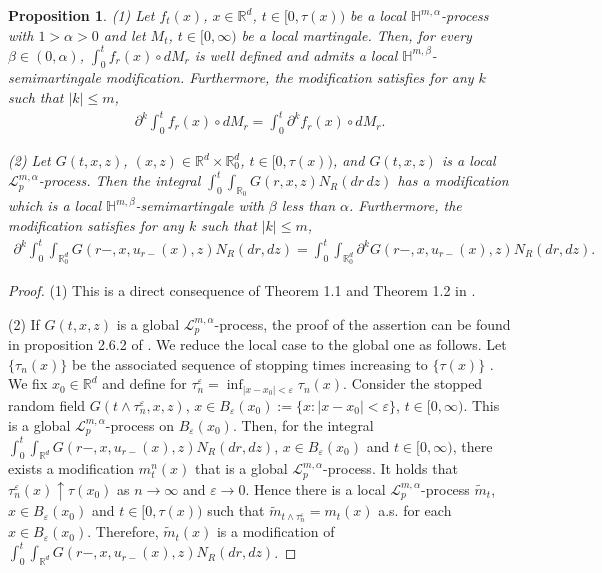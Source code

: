 \documentclass[10pt,a4paper]{amsart}
\newcommand{\ce}{\begin{eqnarray*}}
\newcommand{\de}{\end{eqnarray*}}
\newtheorem{proposition}[theorem]{Proposition}
\def\mH{{\mathbb H}}
\def\mR{{\mathbb R}}
\def\sL{{\mathscr L}}
\def\leq{\leqslant}
\numberwithin{equation}{section}
\begin{document}
\begin{proposition}\label{Prosition3.4}
	(1)  Let $f_t(x)$, $x\in\mR^d$, $t\in[0,\tau(x))$ be a local $\mH^{m,\alpha}$-process with $1>\alpha>0$ and let  $M_t$, $t\in [0,\infty)$ be a local martingale.  Then, for every $\beta\in(0,\alpha)$,
	$\int_0^t f_r(x)\circ dM_r$
 is well defined and admits a local $\mH^{m,\beta}$-semimartingale modification. Furthermore, the modification satisfies for any $k$ such that $|k|\leq m$,
	\ce 
	\partial^k\int_0^tf_r(x)\circ dM_r=\int_0^t \partial^kf_r(x)\circ dM_r.
	\de 
	
	(2) Let $G(t,x,z)$, $(x,z)\in\mR^d\times \mR^d_0$, $t\in[0,\tau(x))$, and $G(t,x,z)$ is a local $\sL_{p}^{m,\alpha}$-process. Then the  integral $\int_0^t\int_{\mR_0}G(r,x,z) N_R(dr\,dz)$ has a modification which is a local $\mH^{m,\beta}$-semimartingale with $\beta$ less than $\alpha$. Furthermore, the modification satisfies for any $k$ such that $|k|\leq m$,
	\ce 
	\partial^k\int_0^t\int_{\mR^d_0} G(r-,x,u_{r-}(x),z) N_R(dr,dz)=\int_0^t\int_{\mR^d_0} \partial^k G(r-,x,u_{r-}(x),z) N_R(dr,dz).
	\de 
\end{proposition}
\begin{proof}
(1) This is a direct consequence of Theorem 1.1 and Theorem 1.2 in \cite{Kunita1984}.

(2) If $G(t,x,z)$ is a global $\sL_{p}^{m,\alpha}$-process, the proof of the assertion can be found in
 proposition 2.6.2 of \cite{KunitaHiroshi2019}. We reduce the local case to the global one as follows.  Let $\{\tau_n(x)\}$ be the associated sequence of stopping times increasing to $\{\tau(x)\}$ . We fix $x_0\in\mR^d$ and define for $\tau_n^{\varepsilon}=\inf_{|x-x_0|<\varepsilon}\tau_n(x)$. Consider the stopped random field $G(t\wedge\tau_n^{\varepsilon},x,z)$, $x\in B_\varepsilon(x_0):=\{x:|x-x_0|<\varepsilon\}$, $t\in[0,\infty)$. This is a global 
  $\sL_{p}^{m,\alpha}$-process on $ B_\varepsilon(x_0)$. Then, for the integral  $\int_0^t\int_{\mR^d} G(r-,x,u_{r-}(x),z) N_R(dr,dz)$, $x\in B_\varepsilon(x_0)$ and $t\in[0,\infty)$, there exists a modification $m_t^n(x)$  that is a global  $\sL_{p}^{m,\alpha}$-process. It holds that $\tau_n^\varepsilon(x)\uparrow \tau(x_0)$ as $n\to\infty$ and $\varepsilon\to 0$. Hence there is a local  $\sL_{p}^{m,\alpha}$-process $\tilde{m}_t$,  $x\in B_\varepsilon(x_0)$ and $t\in[0,\tau(x))$ such that $\tilde{m}_{t\wedge \tau_n^\varepsilon}=m_t(x)$ a.s. for each $x\in B_\varepsilon(x_0)$. Therefore, $\tilde{m}_t(x)$ is a modification of $\int_0^t\int_{\mR^d} G(r-,x,u_{r-}(x),z) N_R(dr,dz)$.
\end{proof}
\end{document}
